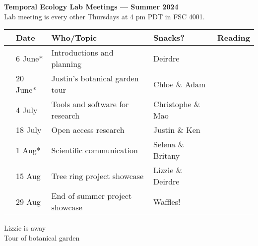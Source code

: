 \documentclass[11pt]{article}
\begin{document}
 
\raggedright
{}

\begin{center} 
{\large \textbf{Temporal Ecology Lab Meetings --- Summer 2024}} \\ [2pt]
Lab meeting is every other Thursdays at 4 pm PDT in FSC 4001.\\ %
\end{center} 

\begin{center}
\begin{tabular}{ p{0.2 cm}  p{2 cm}  p{5 cm}  p{3 cm}  p{3 cm} }  \hline \hline
 & \textbf{Date}
   & \textbf{Who/Topic}
      & \textbf{Snacks?} 
         & \textbf{Reading} \\ 
\hline \hline
& 6 June* & Introductions and planning  &   Deirdre    & \\\hline
 & 20 June* &  Justin's botanical garden tour &  Chloe \& Adam &  \\\hline
 & 4 July &  Tools and software for research & Christophe \& Mao &  \\\hline  
 & 18 July &  Open access research &  Justin \&  Ken &   \\\hline
 & 1 Aug*  & Scientific communication &  Selena \& Britany &  \\\hline 
 & 15 Aug &   Tree ring project showcase & Lizzie \& Deirdre &  \\\hline
 & 29 Aug &  End of summer project showcase & Waffles! & \\\hline 
\hline
\end{tabular}
\end{center}
\noindent *Lizzie is away \\

\vspace{6pt}
 Tour of botanical garden \\
\vspace{7pt}
\end{document}
